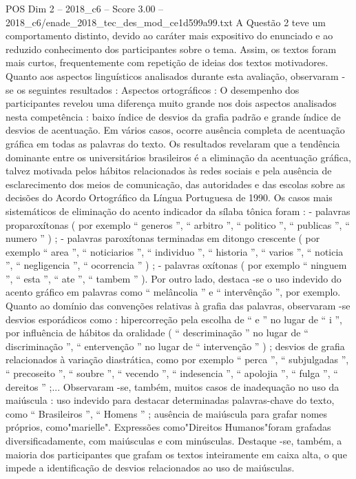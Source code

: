 \begin{textsample}{POS Dim 2 – 2018\_c6 – Score 3.00 – 2018\_c6/enade\_2018\_tec\_des\_mod\_ce1d599a99.txt}
A Questão 2 teve um comportamento distinto, devido ao caráter mais expositivo do enunciado e ao reduzido conhecimento dos participantes sobre o tema.
Assim, os textos foram mais curtos, frequentemente com repetição de ideias dos textos motivadores.
Quanto aos aspectos linguísticos analisados durante esta avaliação, observaram -se os seguintes resultados : Aspectos ortográficos : O desempenho dos participantes revelou uma diferença muito grande nos dois aspectos analisados nesta competência : baixo índice de desvios da grafia padrão e grande índice de desvios de acentuação.
Em vários casos, ocorre ausência completa de acentuação gráfica em todas as palavras do texto.
Os resultados revelaram que a tendência dominante entre os universitários brasileiros é a eliminação da acentuação gráfica, talvez motivada pelos hábitos relacionados às redes sociais e pela ausência de esclarecimento dos meios de comunicação, das autoridades e das escolas sobre as decisões do Acordo Ortográfico da Língua Portuguesa de 1990.
Os casos mais sistemáticos de eliminação do acento indicador da sílaba tônica foram : - palavras proparoxítonas ( por exemplo “ generos ”, “ arbitro ”, “ politico ”, “ publicas ”, “ numero ” ) ; - palavras paroxítonas terminadas em ditongo crescente ( por exemplo “ area ”, “ noticiarios ”, “ individuo ”, “ historia ”, “ varios ”, “ noticia ”, “ negligencia ”, “ ocorrencia ” ) ; - palavras oxítonas ( por exemplo “ ninguem ”, “ esta ”, “ ate ”, “ tambem ” ).
Por outro lado, destaca -se o uso indevido do acento gráfico em palavras como “ melâncolia ” e “ intervênção ”, por exemplo.
Quanto ao domínio das convenções relativas à grafia das palavras, observaram -se desvios esporádicos como : hipercorreção pela escolha de “ e ” no lugar de “ i ”, por influência de hábitos da oralidade ( “ descriminação ” no lugar de “ discriminação ”, “ entervenção ” no lugar de “ intervenção ” ) ; desvios de grafia relacionados à variação diastrática, como por exemplo “ perca ”, “ subjulgadas ”, “ precoseito ”, “ soubre ”, “ vecendo ”, “ indesencia ”, “ apolojia ”, “ fulga ”, “ dereitos ” ;...
Observaram -se, também, muitos casos de inadequação no uso da maiúscula : uso indevido para destacar determinadas palavras-chave do texto, como “ Brasileiros ”, “ Homens ” ; ausência de maiúscula para grafar nomes próprios, como"marielle".
Expressões como"Direitos Humanos"foram grafadas diversificadamente, com maiúsculas e com minúsculas.
Destaque -se, também, a maioria dos participantes que grafam os textos inteiramente em caixa alta, o que impede a identificação de desvios relacionados ao uso de maiúsculas.

\end{textsample}
